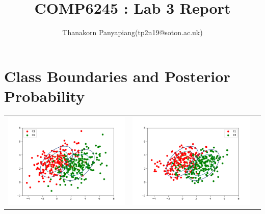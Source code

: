 \documentclass{article}
\title{COMP6245 : Lab 3 Report}
\author{Thanakorn Panyapiang(tp2n19@soton.ac.uk)}
\date{}
\begin{document}
\maketitle

\section{Class Boundaries and Posterior Probability}
\begin{center}
\begin{tabular}{ccc}
\includegraphics[scale=0.25]{y_scatter} &
\includegraphics[scale=0.25]{z_scatter} &

\end{tabular}
\end{center}
\end{document}
